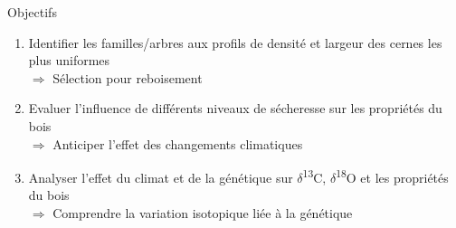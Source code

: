 \documentclass{beamer}
\begin{document}
\begin{frame}{Objectifs}
		\begin{enumerate}[<+- | alert@+>]
		\item Identifier les familles/arbres aux profils de densité et largeur des cernes les plus uniformes\\
		\vspace{0.25cm}
	              $\Rightarrow$ Sélection pour reboisement\\
		\vspace{1cm}
		
		\item Evaluer l'influence de différents niveaux de sécheresse sur les propriétés du bois\\
		\vspace{0.25cm}
	        	$\Rightarrow$ Anticiper l'effet des changements climatiques\\
		\vspace{1cm}
		
		\item Analyser l'effet du climat et de la génétique sur $\delta$\textsuperscript{13}C, $\delta$\textsuperscript{18}O et les propriétés du bois\\
		\vspace{0.25cm}
		$\Rightarrow$ Comprendre la variation isotopique liée à la génétique\\
	    \end{enumerate}
\end{frame}

\end{document}
